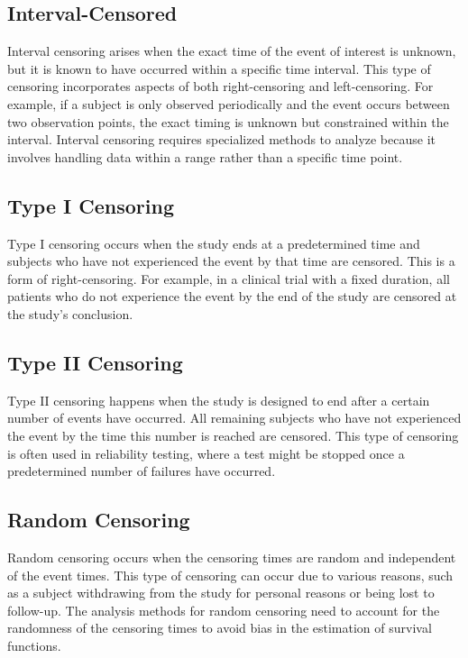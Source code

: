 \documentclass[doublespacing,12pt]{report}
\begin{document}
\subsection{Interval-Censored}

Interval censoring arises when the exact time of the event of interest is unknown, but it is known to have occurred within a specific time interval. This type of censoring incorporates aspects of both right-censoring and left-censoring. For example, if a subject is only observed periodically and the event occurs between two observation points, the exact timing is unknown but constrained within the interval. Interval censoring requires specialized methods to analyze because it involves handling data within a range rather than a specific time point.
\subsection{Type I Censoring}

Type I censoring occurs when the study ends at a predetermined time and subjects who have not experienced the event by that time are censored. This is a form of right-censoring. For example, in a clinical trial with a fixed duration, all patients who do not experience the event by the end of the study are censored at the study's conclusion.

\subsection{Type II Censoring}

Type II censoring happens when the study is designed to end after a certain number of events have occurred. All remaining subjects who have not experienced the event by the time this number is reached are censored. This type of censoring is often used in reliability testing, where a test might be stopped once a predetermined number of failures have occurred.

\subsection{Random Censoring}

Random censoring occurs when the censoring times are random and independent of the event times. This type of censoring can occur due to various reasons, such as a subject withdrawing from the study for personal reasons or being lost to follow-up. The analysis methods for random censoring need to account for the randomness of the censoring times to avoid bias in the estimation of survival functions.
\end{document}
